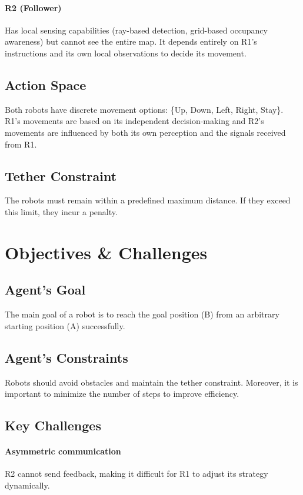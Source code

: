 \documentclass[a4paper,11pt]{article}
\begin{document}
\paragraph{R2 (Follower)} Has local sensing capabilities (ray-based detection, grid-based occupancy awareness) but cannot see the entire map. It depends entirely on R1’s instructions and its own local observations to decide its movement.

\subsection{Action Space}

Both robots have discrete movement options: \{Up, Down, Left, Right, Stay\}. \\
R1’s movements are based on its independent decision-making and R2’s movements are influenced by both its own perception and the signals received from R1.

\subsection{Tether Constraint} The robots must remain within a predefined maximum distance. If they exceed this limit, they incur a penalty.

\section{Objectives \& Challenges}

\subsection{Agent's Goal}

The main goal of a robot is to reach the goal position (B) from an arbitrary starting position (A) successfully.

\subsection{Agent's Constraints} 
Robots should avoid obstacles and maintain the tether constraint. Moreover, it is important to minimize the number of steps to improve efficiency.

\subsection{Key Challenges} \paragraph{Asymmetric communication} R2 cannot send feedback, making it difficult for R1 to adjust its strategy dynamically.
\end{document}
